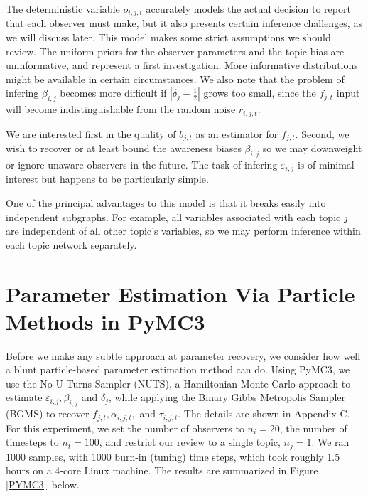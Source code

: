 \documentclass{amsart}
\theoremstyle{plain}
\numberwithin{equation}{section}
\begin{document}

The deterministic variable $o_{i,j,t}$ accurately models the actual decision
to report that each observer must make, but it also presents certain
inference challenges, as we will discuss later. This model makes some strict
assumptions we should review. The uniform priors for the observer parameters
and the topic bias are uninformative, and represent a first investigation.
More informative distributions might be available in certain circumstances.
We also note that the problem of infering $\beta _{i,j}$ becomes more
difficult if $\left\vert \delta _{j}-\frac{1}{2}\right\vert $ grows too
small, since the $f_{j,t}$ input will become indistinguishable from the
random noise $r_{i,j,t}$.

We are interested first in the quality of $b_{j,t}$ as an estimator for $%
f_{j,t}$. Second, we wish to recover or at least bound the awareness biases $%
\beta _{i,j}$ so we may downweight or ignore unaware observers in the
future. The task of infering $\varepsilon _{i,j}$ is of minimal interest but
happens to be particularly simple.

One of the principal advantages to this model is that it breaks easily into
independent subgraphs. For example, all variables associated with each topic 
$j$ are independent of all other topic's variables, so we may perform
inference within each topic network separately.

\section{Parameter Estimation Via Particle Methods in PyMC3}

Before we make any subtle approach at parameter recovery, we consider how
well a blunt particle-based parameter estimation method can do. Using PyMC3,
we use the No U-Turns Sampler (NUTS), a Hamiltonian Monte Carlo approach to
estimate $\varepsilon _{i,j},\beta _{i,j}$ and $\delta _{j}$, while applying
the Binary Gibbs Metropolis Sampler (BGMS) to recover $f_{j,t},\alpha
_{i,j,t},$ and $\tau _{i,j,t}$. The details are shown in Appendix C. For
this experiment, we set the number of observers to $n_{i}=20$, the number of
timesteps to $n_{t}=100$, and restrict our review to a single topic, $%
n_{j}=1 $. We ran 1000 samples, with 1000 burn-in (tuning) time steps, which
took roughly 1.5 hours on a 4-core Linux machine. The results are summarized
in Figure \ref{PYMC3}\ below.
\end{document}
